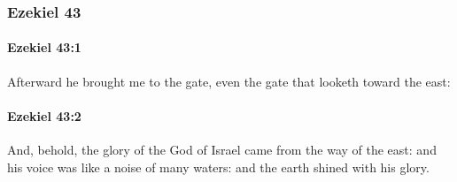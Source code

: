 	\subsubsection{Ezekiel 43} %
		\label{EZEKIEL-43}

		\paragraph{Ezekiel 43:1} %
			\label{EZEKIEL-43-1}

			Afterward he brought me to the gate, even the gate that looketh toward the east:


		\paragraph{Ezekiel 43:2} %
			\label{EZEKIEL-43-2}

			And, behold, the glory of the God of Israel came from the way of the east: and his voice was like a noise of many waters: and the earth shined with his glory.

